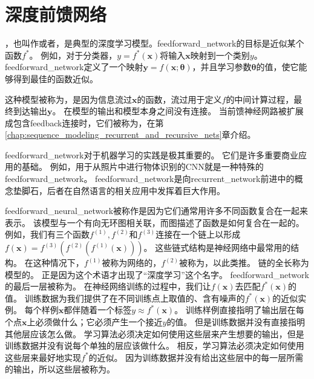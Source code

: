 \chapter{深度前馈网络}
\label{chap:deep_feedforward_networks}

，也叫作或者，是典型的深度学习模型。\gls{feedforward_network}的目标是近似某个函数$f^*$。
例如，对于分类器，$y = f^*(\bm{x})$将输入$\bm{x}$映射到一个类别$y$。
\gls{feedforward_network}定义了一个映射$\bm{y} = f(\bm{x}; \bm{\theta})$，并且学习参数$\bm{\theta}$的值，使它能够得到最佳的函数近似。

这种模型被称为，是因为信息流过$\bm{x}$的函数，流过用于定义$f$的中间计算过程，最终到达输出$\bm{y}$。
在模型的输出和模型本身之间没有连接。
当前馈神经网路被扩展成包含\gls{feedback}连接时，它们被称为，在第\ref{chap:sequence_modeling_recurrent_and_recursive_nets}章介绍。

\gls{feedforward_network}对于机器学习的实践是极其重要的。
它们是许多重要商业应用的基础。
例如，用于从照片中进行物体识别的\gls{CNN}就是一种特殊的\gls{feedforward_network}。
\gls{feedforward_network}是向\gls{recurrent_network}前进中的概念垫脚石，后者在自然语言的相关应用中发挥着巨大作用。

\gls{feedforward_neural_network}被称作是因为它们通常用许多不同函数复合在一起来表示。
该模型与一个有向无环图相关联，而图描述了函数是如何复合在一起的。
例如，我们有三个函数$f^{(1)}, f^{(2)}$和$f^{(3)}$连接在一个链上以形成$f(\bm{x}) = f^{(3)}(f^{(2)}(f^{(1)}(\bm{x})) )$。
这些链式结构是神经网络中最常用的结构。
在这种情况下，$f^{(1)}$被称为网络的，$f^{(2)}$被称为，以此类推。
链的全长称为模型的。
正是因为这个术语才出现了``深度学习''这个名字。
\gls{feedforward_network}的最后一层被称为。
在神经网络训练的过程中，我们让$f(\bm{x})$去匹配$f^*(\bm{x})$的值。
训练数据为我们提供了在不同训练点上取值的、含有噪声的$f^*(\bm{x})$的近似实例。
每个样例$\bm{x}$都伴随着一个标签$y\approx f^*(\bm{x})$。
训练样例直接指明了输出层在每个点$\bm{x}$上必须做什么；它必须产生一个接近$y$的值。
但是训练数据并没有直接指明其他层应该怎么做。
学习算法必须决定如何使用这些层来产生想要的输出，但是训练数据并没有说每个单独的层应该做什么。
相反，学习算法必须决定如何使用这些层来最好地实现$f^*$的近似。
因为训练数据并没有给出这些层中的每一层所需的输出，所以这些层被称为。

